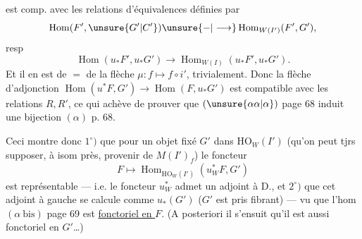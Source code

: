 est comp. avec les relations d'équivalences définies par
\[
\operatorname{Hom}(F',\unsure{G'|C'})\unsure{-|\longrightarrow}\operatorname{Hom}_{W(I')}(F',G'),
\]
resp
\[
\operatorname{Hom}(u_*F',u_*G')\longrightarrow\operatorname{Hom}_{W(I)}(u_*F',u_*G').
\]
Et il en est de $=$ de la flèche $\mu:f\mapsto f\circ i'$, trivialement. Donc la flèche d'adjonction $\operatorname{Hom}(u^*F,G')\longrightarrow\operatorname{Hom}(F,u_*G')$ est compatible avec les relations $R,R'$, ce qui achève de prouver que $(\unsure{\alpha\alpha|\alpha})$ page 68 induit une bijection $(\alpha)$ p. 68.

 Ceci montre donc $1^\circ)$ que pour un objet fixé $G'$ dans $\mathrm{HO}_W(I')$ (qu'on peut tjrs supposer, à isom près, provenir de $M(I')_f$) le foncteur
\[
F\longmapsto\operatorname{Hom}_{\mathrm{HO}_W(I')}(u_W^*F,G')
\]
est représentable --- i.e. le foncteur $u_W^*$ admet un adjoint à D., et $2^\circ)$ que cet adjoint à gauche se calcule comme $u_*(G')$
($G'$ est pris fibrant) ---  vu que l'hom $(\alpha\ \text{bis})$ page 69 est \uline{fonctoriel en $F$}. (A posteriori il s'ensuit qu'il est aussi fonctoriel en $G'$\ldots)
